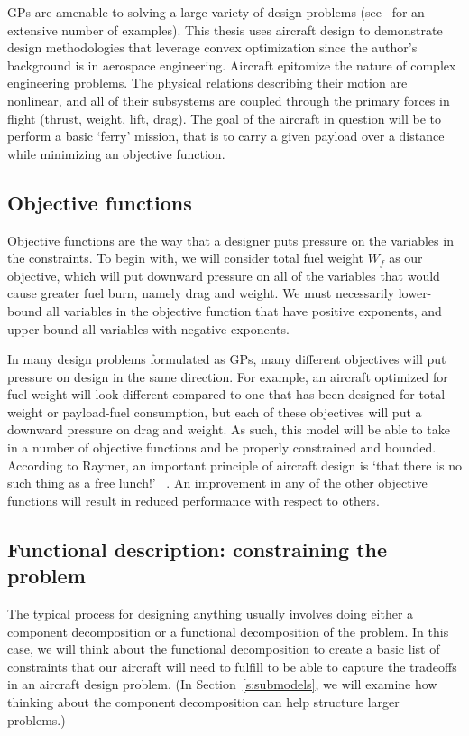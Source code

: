 \gls{GP}s are amenable to solving a large variety of design problems (see~\cite{gpintro} for an
extensive number of examples). This thesis uses aircraft design to demonstrate
design methodologies that leverage convex optimization since the author's background is in aerospace engineering.
Aircraft epitomize the nature of complex engineering problems. The physical 
relations describing their motion are nonlinear, and all of their subsystems are 
coupled through the primary forces in flight (thrust, weight, lift, drag).
The goal of the aircraft in question will be to perform a basic `ferry' mission, that
is to carry a given payload
over a distance while minimizing an objective function.

\subsection{Objective functions}
\label{s:objective}

Objective functions are the way that a designer puts pressure on the variables 
in the constraints. To begin with, we will consider
total fuel weight $W_f$ as our objective, which will put
downward pressure on all of the variables that would cause greater fuel burn, namely
drag and weight. We must necessarily lower-bound all variables in the objective function
that have positive exponents, and upper-bound all variables with negative exponents.

In many design problems
formulated as \gls{GP}s, many different objectives will put pressure on design
in the same direction. For example, an aircraft optimized for fuel weight will look
different compared to one
that has been designed for total weight or payload-fuel consumption, but each
of these objectives will put a downward pressure on drag and weight.
As such, this model will be able to take in a number of objective functions
and be properly constrained and bounded. According to Raymer, an important
principle of aircraft design is `that there is no such thing as a free lunch!'
~\cite[pg.26]{raymer}. An improvement in any of the other objective functions
will result in reduced performance with respect to others.

\subsection{Functional description: constraining the problem}

The typical process for designing anything usually involves doing either a
component decomposition or a functional decomposition of the problem. In
this case, we will think about the functional decomposition to create a
basic list of constraints that our aircraft will need to fulfill to be
able to capture the tradeoffs in an aircraft design problem. (In
Section~\ref{s:submodels}, we will examine how thinking about the component decomposition
can help structure larger problems.)


